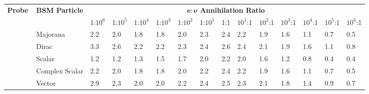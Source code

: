 \documentclass[notitlepage,letterpaper,natbib,aps,prd,onecolumn,amsmath,amsfonts,nofootinbib,preprintnumbers,superscriptaddress,secnumarabic,groupedaddress]{revtex4-1}
\begin{document}
\begin{table}[h]
{\def\arraystretch{1.3}
\begin{tabular}{c|l|p{0.7cm}|p{0.7cm}|p{0.7cm}|p{0.7cm}|p{0.7cm}|p{0.7cm}|p{0.7cm}|p{0.7cm}|p{0.7cm}|p{0.7cm}|p{2.08cm}|p{2.08cm}|p{0.7cm}}
\hline\hline
\multirow{2}{*}{\textbf{Probe}$\,$} & \multirow{2}{*}{\vspace*{-0.1 cm}\textbf{BSM Particle}} & \multicolumn{13}{c}{$\boldsymbol{e :}  \boldsymbol{\nu}$ \textbf{Annihilation Ratio}}\\
  &                       & \multicolumn{1}{c}{1:$10^6$} & \multicolumn{1}{c}{1:$10^5$} & \multicolumn{1}{c}{1:$10^4$} & \multicolumn{1}{c}{1:$10^3$} & \multicolumn{1}{c}{1:$10^2$} & \multicolumn{1}{c}{1:$10^1$} & \multicolumn{1}{c}{1:1} & \multicolumn{1}{c}{$10^1$:1} & \multicolumn{1}{c}{$10^2$:1} & \multicolumn{1}{c}{$10^3$:1} & \multicolumn{1}{c}{$10^4$:1} & \multicolumn{1}{c}{$10^5$:1} & \multicolumn{1}{c}{$10^6$:1} \\ \hline\hline
\parbox[t]{5mm}{} & Majorana      & \hfil 2.2           &    \hfil 2.0        &  \hfil 1.8          & \hfil 1.8           & \hfil 2.0           &    \hfil 2.3        & \hfil 2.4     &  \hfil 2.2         &  \hfil 1.9           &  \hfil 1.6           &    \hfil 1.1         &  \hfil 0.7           & \hfil 0.5            \\
                          & Dirac        & \hfil 3.3           &  \hfil 2.6          &  \hfil 2.2          &  \hfil 2.2          &  \hfil 2.3          &      \hfil 2.4      & \hfil 2.6      &  \hfil 2.4          &  \hfil 2.1          &  \hfil 1.9          &  \hfil 1.6          &   \hfil 1.1         &  \hfil 0.8          \\
                          & Scalar       & \hfil 1.2           & \hfil 1.2           & \hfil 1.3           & \hfil 1.5           & \hfil 1.7           & \hfil 2.0           &    \hfil 2.2   & \hfil 2.0           & \hfil 1.6           & \hfil 1.2           & \hfil 0.8           & \hfil 0.4           & \hfil 0.4           \\
                          & Complex Scalar & \hfil 2.2           & \hfil 2.0           & \hfil 1.8           & \hfil 1.8           & \hfil 2.0           & \hfil 2.2           & \hfil 2.4      & \hfil 2.2           & \hfil 1.9           & \hfil 1.6           & \hfil 1.1           & \hfil 0.7           & \hfil 0.5           \\
                          & Vector      & \hfil 2.9      & \hfil 2.3  & \hfil 2.0         & \hfil 2.0           & \hfil 2.2           & \hfil 2.4           & \hfil 2.5      & \hfil 2.3           &  \hfil 2.1          &  \hfil 1.8          &  \hfil 1.4          &  \hfil 0.9          &  \hfil 0.7          \\  \hline

\end{tabular}}
\end{table}
\end{document}
